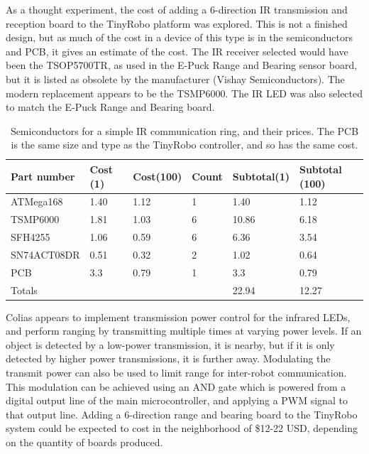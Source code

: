 As a thought experiment, the cost of adding a 6-direction IR transmission and reception board to the TinyRobo platform was explored. 
This is not a finished design, but as much of the cost in a device of this type is in the semiconductors and PCB, it gives an estimate of the cost. 
The IR receiver selected would have been the TSOP5700TR, as used in the E-Puck Range and Bearing sensor board, but it is listed as obsolete by the manufacturer (Vishay Semiconductors). 
The modern replacement appears to be the TSMP6000.
The IR LED was also selected to match the E-Puck Range and Bearing board.

\begin{table}
	\begin{tabular}{l l l l l l}
		Part number & Cost (1) & Cost(100) & Count & Subtotal(1) & Subtotal (100)\\
		\hline 
		ATMega168 & 1.40 & 1.12 & 1 & 1.40 & 1.12  \\
		TSMP6000 & 1.81 & 1.03 & 6 & 10.86 & 6.18  \\
		SFH4255  & 1.06 & 0.59 & 6 & 6.36 & 3.54 \\
		SN74ACT08DR & 0.51 & 0.32 & 2 & 1.02 & 0.64 \\
		PCB & 3.3 & 0.79 & 1 & 3.3 & 0.79\\
		\hline 
		Totals & & & & 22.94 & 12.27\\
	\end{tabular}
	\caption{Semiconductors for a simple IR communication ring, and their prices. The PCB is the same size and type as the TinyRobo controller, and so has the same cost.}
	\label{tab:ir_ranger_board}
\end{table}

Colias appears to implement transmission power control for the infrared LEDs, and perform ranging by transmitting multiple times at varying power levels. 
If an object is detected by a low-power transmission, it is nearby, but if it is only detected by higher power transmissions, it is further away. 
Modulating the transmit power can also be used to limit range for inter-robot communication.
This modulation can be achieved using an AND gate which is powered from a digital output line of the main microcontroller, and applying a PWM signal to that output line.
Adding a 6-direction range and bearing board to the TinyRobo system could be expected to cost in the neighborhood of \$12-22 USD, depending on the quantity of boards produced. 


